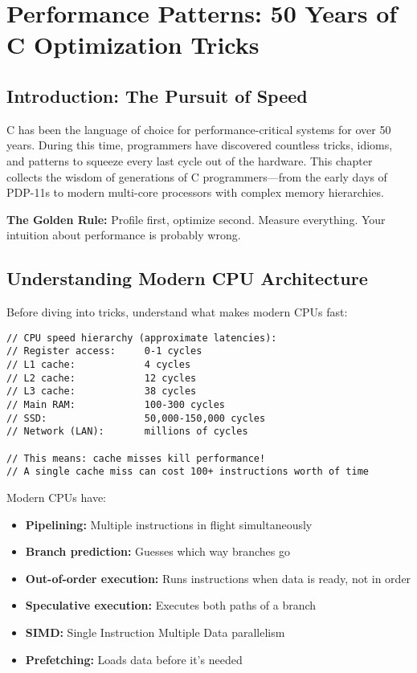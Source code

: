 \chapter{Performance Patterns: 50 Years of C Optimization Tricks}

\section{Introduction: The Pursuit of Speed}

C has been the language of choice for performance-critical systems for over 50 years. During this time, programmers have discovered countless tricks, idioms, and patterns to squeeze every last cycle out of the hardware. This chapter collects the wisdom of generations of C programmers—from the early days of PDP-11s to modern multi-core processors with complex memory hierarchies.

\begin{tipbox}
\textbf{The Golden Rule:} Profile first, optimize second. Measure everything. Your intuition about performance is probably wrong.
\end{tipbox}

\section{Understanding Modern CPU Architecture}

Before diving into tricks, understand what makes modern CPUs fast:

\begin{lstlisting}
// CPU speed hierarchy (approximate latencies):
// Register access:     0-1 cycles
// L1 cache:            4 cycles
// L2 cache:            12 cycles
// L3 cache:            38 cycles
// Main RAM:            100-300 cycles
// SSD:                 50,000-150,000 cycles
// Network (LAN):       millions of cycles

// This means: cache misses kill performance!
// A single cache miss can cost 100+ instructions worth of time
\end{lstlisting}

Modern CPUs have:
\begin{itemize}
    \item \textbf{Pipelining:} Multiple instructions in flight simultaneously
    \item \textbf{Branch prediction:} Guesses which way branches go
    \item \textbf{Out-of-order execution:} Runs instructions when data is ready, not in order
    \item \textbf{Speculative execution:} Executes both paths of a branch
    \item \textbf{SIMD:} Single Instruction Multiple Data parallelism
    \item \textbf{Prefetching:} Loads data before it's needed
\end{itemize}

